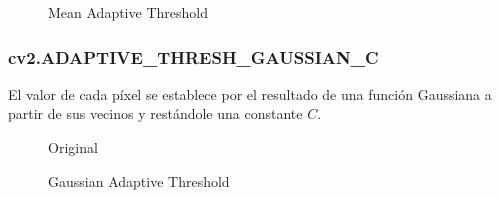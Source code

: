 \begin{figure}[H]
  \centering \setlength\fboxsep{0pt} \setlength\fboxrule{0.5pt}
  \caption{Mean Adaptive Threshold}
\end{figure}

\subsubsection{cv2.ADAPTIVE\_THRESH\_GAUSSIAN\_C}\label{tecnica:threshold-adaptativo-gauss}
El valor de cada píxel se establece por el resultado de una función
Gaussiana a partir de sus vecinos y restándole una constante $C$.

\begin{figure}[H]
  \caption{Original}
  \centering \setlength\fboxsep{0pt} \setlength\fboxrule{0.5pt}
\end{figure}

\begin{figure}[H]
  \centering \setlength\fboxsep{0pt} \setlength\fboxrule{0.5pt}
  \caption{Gaussian Adaptive Threshold}
\end{figure}

